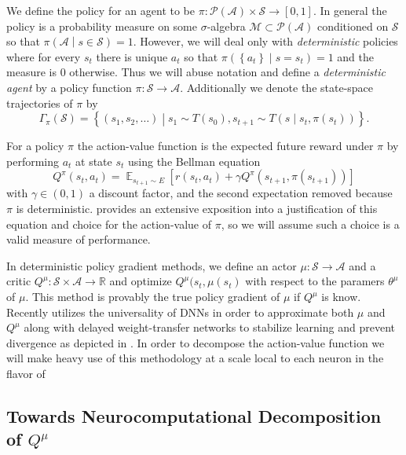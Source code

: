 \documentclass{article} %
\numberwithin{equation}{subsection}
\numberwithin{theorem}{subsection}
\def\expect{\mathop{{\mathbb{E}}}}
\newcommand{\set}[1]{ \left\{ #1 \right\} }
\def\suchthat{\mathrel{}\middle|\mathrel{}}
\def\scriptm{{\mathcal M}}
\def\scripta{{\mathcal A}}
\def\scriptp{{\mathcal P}}
\def\scripts{{\mathcal S}}
\begin{document}
We define the policy for an agent to be $\pi: \scriptp(\scripta) \times \scripts \to [0,1]$. In general the policy is a probability measure on some $\sigma$-algebra $\scriptm \subset \scriptp(\scripta)$ conditioned on $\scripts$ so that $\pi\left(\scripta \suchthat s \in \scripts\right) = 1$. However, we will deal only with \emph{deterministic} policies where for every $s_t$ there is unique $a_t$ so that $\pi\left(\set{a_t} \suchthat s = s_t\right) = 1$ and the measure is $0$ otherwise. Thus we will abuse notation and define a \emph{deterministic agent} by a policy function $\pi: \scripts \to \scripta$. Additionally we denote the state-space trajectories of $\pi $ by 
\begin{equation}
 	\Gamma_\pi(\scripts) = \set{(s_1, s_2, \dots)\suchthat s_1 \sim T(s_0), s_{t+1} \sim T\left(s \suchthat s_t, \pi(s_t)\right)}.
 \end{equation} 

For a policy $\pi$  the action-value function is the expected future reward under $\pi$ by performing $a_t$ at state $s_t$ using the Bellman equation
\begin{equation}
    Q^{\pi}(s_t, a_t) = \expect_{s_{t+1} \sim E}\left[r(s_{t}, a_t) + \gamma Q^{\pi}(s_{t+1}, \pi(s_{t+1}))\right]
\end{equation}
with $\gamma \in (0,1)$ a discount factor, and the second expectation removed because $\pi$ is deterministic.  provides an extensive exposition into a justification of this equation and choice for the action-value of $\pi$, so we will assume such a choice is a valid measure of performance.

In deterministic policy gradient methods, we define an actor $\mu: \scripts \to \scripta$ and a critic $Q^\mu: \scripts \times \scripta \to \mathbb{R}$ and optimize $Q^\mu(s_t, \mu(s_t)$ with respect to the paramers $\theta^\mu$ of $\mu.$ This method is provably the true policy gradient of $\mu$ if $Q^\mu$ is know. Recently  utilizes the universality of DNNs in order to approximate both $\mu$ and $Q^\mu$ along with delayed weight-transfer networks to stabilize learning and  prevent divergence as depicted in . In order to decompose the action-value function we will make heavy use of this methodology at a scale local to each neuron in the flavor of 

\subsection{Towards Neurocomputational Decomposition of $Q^\mu$}
\end{document}
